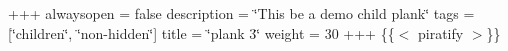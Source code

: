 +++ alwaysopen = false description = \char`\"{}\+This be a demo child plank\char`\"{} tags = \mbox{[}\char`\"{}children\char`\"{}, \char`\"{}non-\/hidden\char`\"{}\mbox{]} title = \char`\"{}plank 3\char`\"{} weight = 30 +++ \{\{$<$ piratify $>$\}\} 